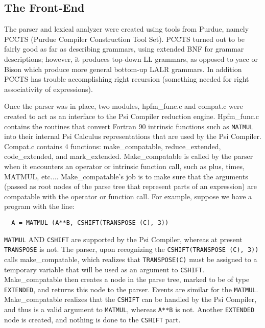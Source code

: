 
\subsection{The Front-End}
The parser and lexical analyzer were created using tools
from Purdue, namely PCCTS (Purdue Compiler Construction Tool Set).  
PCCTS turned out to be fairly good as far as describing grammars, using
extended BNF for grammar descriptions; however,
it produces top-down LL grammars, as opposed to yacc or Bison which produce
more general bottom-up LALR grammars. In addition PCCTS has trouble 
accomplishing right recursion (something needed for right associativity
of expressions).

Once the parser was in place, two modules, hpfm\_func.c
and compat.c were created to act as an interface to the Psi Compiler
reduction engine.  Hpfm\_func.c contains the routines that convert
Fortran 90 intrinsic functions such as {\tt MATMUL} into their internal
Psi Calculus representations that are used by the Psi Compiler.
Compat.c contains 4 functions: make\_compatable,
reduce\_extended, code\_extended, and mark\_extended.  Make\_compatable
is called by the parser when it encounters an operator or intrinsic
function call, such as plus, times, MATMUL, etc....  Make\_compatable's
job is to make sure that the arguments (passed as root nodes of the
parse tree that represent parts of an expression)
are compatable with the operator
or function call.  For example, suppose we have a program with
the line:
\begin{verbatim}
  A = MATMUL (A**B, CSHIFT(TRANSPOSE (C), 3))
\end{verbatim}
{\tt MATMUL} AND {\tt CSHIFT} are supported by the Psi Compiler, whereas
at present {\tt TRANSPOSE} is not.  The parser, upon recognizing the
{\tt CSHIFT(TRANSPOSE (C), 3))} calls make\_compatable, which 
realizes that {\tt TRANSPOSE(C)} must be assigned to a temporary variable
that will be used as an argument to {\tt CSHIFT}.  
Make\_compatable then creates a node in the parse tree, marked to be 
of type {\tt EXTENDED}, and returns this node to the parser.  Events are
similar for the {\tt MATMUL}.  Make\_compatable realizes that the
{\tt CSHIFT} can be handled by the Psi Compiler, and thus is a valid
argument to {\tt MATMUL}, whereas {\tt A**B} is not.  Another {\tt EXTENDED}
node is created, and nothing is done to the {\tt CSHIFT} part.  

